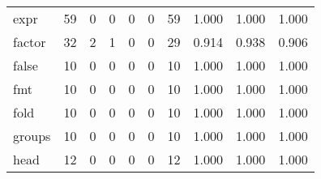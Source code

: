 \begin{longtable}{lp{1.3cm}p{1.3cm}p{1.3cm}p{1.3cm}p{1.3cm}p{1.3cm}p{1.3cm}p{1.3cm}p{1.3cm}}
expr      &                     59 &                                             0 &                                            0 &                                           0 &                                            0 &                                         59 &                                1.000 &                                  1.000 &                                1.000 \\
factor    &                     32 &                                             2 &                                            1 &                                           0 &                                            0 &                                         29 &                                0.914 &                                  0.938 &                                0.906 \\
false     &                     10 &                                             0 &                                            0 &                                           0 &                                            0 &                                         10 &                                1.000 &                                  1.000 &                                1.000 \\
fmt       &                     10 &                                             0 &                                            0 &                                           0 &                                            0 &                                         10 &                                1.000 &                                  1.000 &                                1.000 \\
fold      &                     10 &                                             0 &                                            0 &                                           0 &                                            0 &                                         10 &                                1.000 &                                  1.000 &                                1.000 \\
groups    &                     10 &                                             0 &                                            0 &                                           0 &                                            0 &                                         10 &                                1.000 &                                  1.000 &                                1.000 \\
head      &                     12 &                                             0 &                                            0 &                                           0 &                                            0 &                                         12 &                                1.000 &                                  1.000 &                                1.000 \\

\end{longtable}
